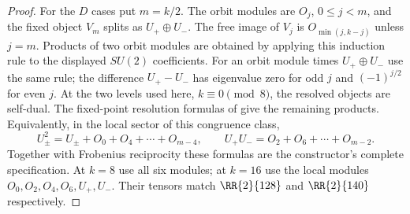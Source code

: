 \begin{proof}
For the $D$ cases put $m=k/2$. The orbit modules are $O_j$,
$0\le j<m$, and the fixed object $V_m$ splits as $U_+\oplus U_-$.
The free image of $V_j$ is $O_{\min(j,k-j)}$ unless $j=m$.
Products of two orbit modules are obtained by applying this induction
rule to the displayed $SU(2)$ coefficients. For an orbit module times
$U_+\oplus U_-$ use the same rule; the difference $U_+-U_-$ has
eigenvalue zero for odd $j$ and $(-1)^{j/2}$ for even $j$. At the two
levels used here, $k\equiv0\pmod8$, the resolved objects are self-dual.
The fixed-point resolution formulas of \cite[Section~7, $D_{2m}$ fusion
table]{KO} give the remaining products. Equivalently, in the local
sector of this congruence class,
\[
 U_\pm^2=U_\pm+O_0+O_4+\cdots+O_{m-4},\qquad
 U_+U_-=O_2+O_6+\cdots+O_{m-2}.
\]
Together with Frobenius reciprocity these formulas are the constructor's
complete specification. At $k=8$ use all six modules; at $k=16$ use the
local modules $O_0,O_2,O_4,O_6,U_+,U_-$. Their tensors match
$\RR{2}{128}$ and $\RR{2}{140}$ respectively.
\end{proof}

